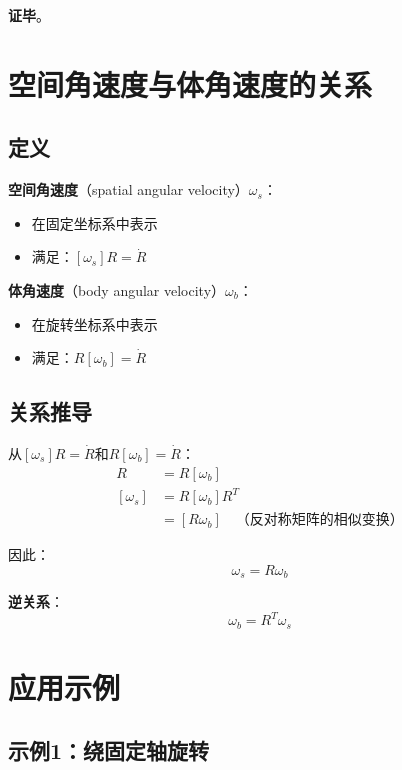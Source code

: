 \documentclass[12pt,a4paper]{article}
\begin{document}
\textbf{证毕}。

\section{空间角速度与体角速度的关系}

\subsection{定义}

\textbf{空间角速度}（spatial angular velocity）$\omega_s$：
\begin{itemize}
\item 在固定坐标系中表示
\item 满足：$[\omega_s] R = \dot{R}$
\end{itemize}

\textbf{体角速度}（body angular velocity）$\omega_b$：
\begin{itemize}
\item 在旋转坐标系中表示
\item 满足：$R [\omega_b] = \dot{R}$
\end{itemize}

\subsection{关系推导}

从$[\omega_s] R = \dot{R}$和$R [\omega_b] = \dot{R}$：
\begin{align}
[\omega_s] R &= R [\omega_b] \\
[\omega_s] &= R [\omega_b] R^T \\
&= [R \omega_b] \quad \text{（反对称矩阵的相似变换）}
\end{align}

因此：
\begin{equation}
\omega_s = R \omega_b
\end{equation}

\textbf{逆关系}：
\begin{equation}
\omega_b = R^T \omega_s
\end{equation}

\section{应用示例}

\subsection{示例1：绕固定轴旋转}
\end{document}
